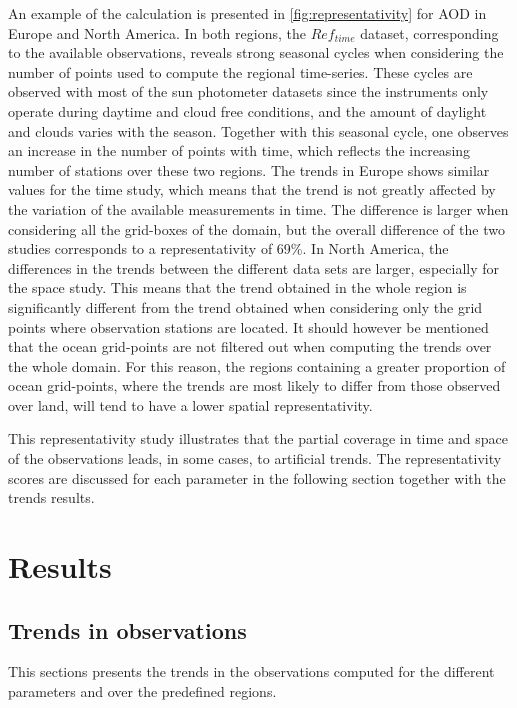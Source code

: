 \documentclass[journal abbreviation, manuscript]{copernicus}
\begin{document}
An example of the calculation is presented in \ref{fig:representativity} for AOD in Europe and North America. In both regions, the $Ref_{time}$ dataset, corresponding to the available observations, reveals strong seasonal cycles when considering the number of points used to compute the regional time-series. These cycles are observed with most of the sun photometer datasets since the instruments only operate during daytime and cloud free conditions, and the amount of daylight and clouds varies with the season. Together with this seasonal cycle, one observes an increase in the number of points with time, which reflects the increasing number of stations over these two regions. The trends in Europe shows similar values for the time study, which means that the trend is not greatly affected by the variation of the available measurements in time. The difference is larger when considering all the grid-boxes of the domain, but the overall difference of the two studies corresponds to a representativity of 69\%. In North America, the differences in the trends between the different data sets are larger, especially for the space study. This means that the trend obtained in the whole region is significantly different from the trend obtained when considering only the grid points where observation stations are located. It should however be mentioned that the ocean grid-points are not filtered out when computing the trends over the whole domain. For this reason, the regions containing a greater proportion of ocean grid-points, where the trends are most likely to differ from those observed over land, will tend to have a lower spatial representativity.

This representativity study illustrates that the partial coverage in time and space of the observations leads, in some cases, to artificial trends. The representativity scores are discussed for each parameter in the following section together with the trends results.

\section{Results}

\subsection{Trends in observations}\label{obs_trends}
This sections presents the trends in the observations computed for the different parameters and over the predefined regions.
\end{document}
